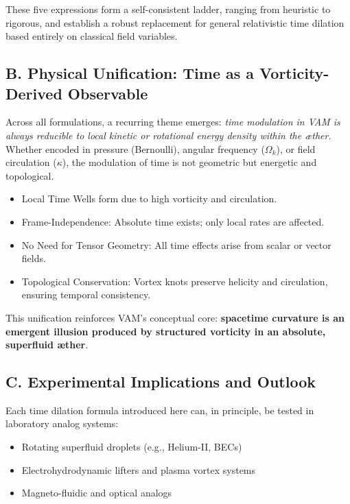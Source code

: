 These five expressions form a self-consistent ladder, ranging from heuristic to rigorous, and establish a robust replacement for general relativistic time dilation based entirely on classical field variables.

\subsection*{B. Physical Unification: Time as a Vorticity-Derived Observable}

Across all formulations, a recurring theme emerges: \textit{time modulation in VAM is always reducible to local kinetic or rotational energy density within the æther}. Whether encoded in pressure (Bernoulli), angular frequency (\( \Omega_k \)), or field circulation (\( \kappa \)), the modulation of time is not geometric but energetic and topological.

\begin{itemize}
    \item Local Time Wells form due to high vorticity and circulation.
    \item Frame-Independence: Absolute time exists; only local rates are affected.
    \item No Need for Tensor Geometry: All time effects arise from scalar or vector fields.
    \item Topological Conservation: Vortex knots preserve helicity and circulation, ensuring temporal consistency.
\end{itemize}

This unification reinforces VAM’s conceptual core: \textbf{spacetime curvature is an emergent illusion produced by structured vorticity in an absolute, superfluid æther}.

\subsection*{C. Experimental Implications and Outlook}

Each time dilation formula introduced here can, in principle, be tested in laboratory analog systems:
\begin{itemize}
    \item Rotating superfluid droplets (e.g., Helium-II, BECs)
    \item Electrohydrodynamic lifters and plasma vortex systems
    \item Magneto-fluidic and optical analogs
\end{itemize}

